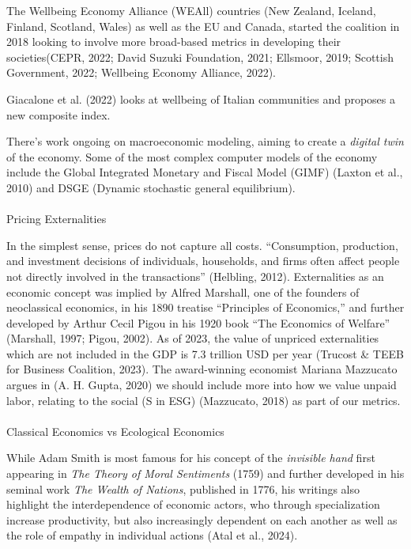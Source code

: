 \documentclass[
  letterpaper,
  DIV=11,
  numbers=noendperiod]{scrartcl}
\makeatletter
\let\oldparagraph\paragraph
\renewcommand{\paragraph}{
    \@ifstar
      \xxxParagraphStar
      \xxxParagraphNoStar
  }
\newcommand{\xxxParagraphStar}[1]{\oldparagraph*{#1}\mbox{}}
\newcommand{\xxxParagraphNoStar}[1]{\oldparagraph{#1}\mbox{}}
\makeatother
\begin{document}
The Wellbeing Economy Alliance (WEAll) countries (New Zealand, Iceland,
Finland, Scotland, Wales) as well as the EU and Canada, started the
coalition in 2018 looking to involve more broad-based metrics in
developing their societies(CEPR, 2022; David Suzuki Foundation, 2021;
Ellsmoor, 2019; Scottish Government, 2022; Wellbeing Economy Alliance,
2022).

Giacalone et al. (2022) looks at wellbeing of Italian communities and
proposes a new composite index.

There's work ongoing on macroeconomic modeling, aiming to create a
\emph{digital twin} of the economy. Some of the most complex computer
models of the economy include the Global Integrated Monetary and Fiscal
Model (GIMF) (Laxton et al., 2010) and DSGE (Dynamic stochastic general
equilibrium).

\paragraph{Pricing Externalities}\label{pricing-externalities}

In the simplest sense, prices do not capture all costs. ``Consumption,
production, and investment decisions of individuals, households, and
firms often affect people not directly involved in the transactions''
(Helbling, 2012). Externalities as an economic concept was implied by
Alfred Marshall, one of the founders of neoclassical economics, in his
1890 treatise ``Principles of Economics,'' and further developed by
Arthur Cecil Pigou in his 1920 book ``The Economics of Welfare''
(Marshall, 1997; Pigou, 2002). As of 2023, the value of unpriced
externalities which are not included in the GDP is 7.3 trillion USD per
year (Trucost \& TEEB for Business Coalition, 2023). The award-winning
economist Mariana Mazzucato argues in (A. H. Gupta, 2020) we should
include more into how we value unpaid labor, relating to the social (S
in ESG) (Mazzucato, 2018) as part of our metrics.

\paragraph{Classical Economics vs Ecological
Economics}\label{classical-economics-vs-ecological-economics}

While Adam Smith is most famous for his concept of the \emph{invisible
hand} first appearing in \emph{The Theory of Moral Sentiments} (1759)
and further developed in his seminal work \emph{The Wealth of Nations},
published in 1776, his writings also highlight the interdependence of
economic actors, who through specialization increase productivity, but
also increasingly dependent on each another as well as the role of
empathy in individual actions (Atal et al., 2024).
\end{document}

